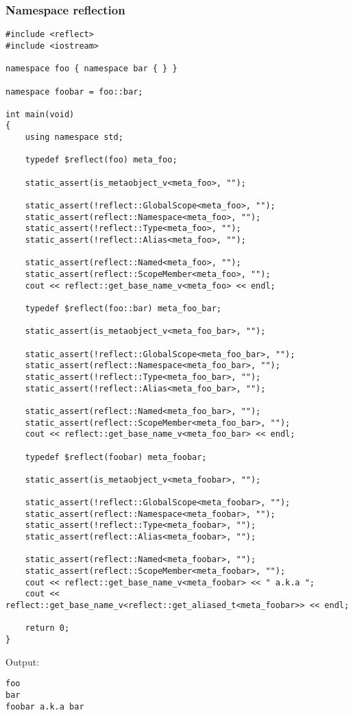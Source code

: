 \subsubsection{Namespace reflection}

\begin{verbatim}
#include <reflect>
#include <iostream>

namespace foo { namespace bar { } }

namespace foobar = foo::bar;

int main(void)
{
	using namespace std;

	typedef $reflect(foo) meta_foo;

	static_assert(is_metaobject_v<meta_foo>, "");

	static_assert(!reflect::GlobalScope<meta_foo>, "");
	static_assert(reflect::Namespace<meta_foo>, "");
	static_assert(!reflect::Type<meta_foo>, "");
	static_assert(!reflect::Alias<meta_foo>, "");

	static_assert(reflect::Named<meta_foo>, "");
	static_assert(reflect::ScopeMember<meta_foo>, "");
	cout << reflect::get_base_name_v<meta_foo> << endl;

	typedef $reflect(foo::bar) meta_foo_bar;

	static_assert(is_metaobject_v<meta_foo_bar>, "");

	static_assert(!reflect::GlobalScope<meta_foo_bar>, "");
	static_assert(reflect::Namespace<meta_foo_bar>, "");
	static_assert(!reflect::Type<meta_foo_bar>, "");
	static_assert(!reflect::Alias<meta_foo_bar>, "");

	static_assert(reflect::Named<meta_foo_bar>, "");
	static_assert(reflect::ScopeMember<meta_foo_bar>, "");
	cout << reflect::get_base_name_v<meta_foo_bar> << endl;

	typedef $reflect(foobar) meta_foobar;

	static_assert(is_metaobject_v<meta_foobar>, "");

	static_assert(!reflect::GlobalScope<meta_foobar>, "");
	static_assert(reflect::Namespace<meta_foobar>, "");
	static_assert(!reflect::Type<meta_foobar>, "");
	static_assert(reflect::Alias<meta_foobar>, "");

	static_assert(reflect::Named<meta_foobar>, "");
	static_assert(reflect::ScopeMember<meta_foobar>, "");
	cout << reflect::get_base_name_v<meta_foobar> << " a.k.a ";
	cout << reflect::get_base_name_v<reflect::get_aliased_t<meta_foobar>> << endl;

	return 0;
}
\end{verbatim}

Output:

\begin{verbatim}
foo
bar
foobar a.k.a bar
\end{verbatim}

